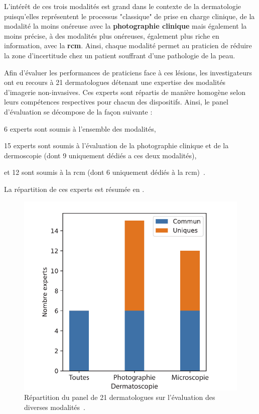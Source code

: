 L'intérêt de ces trois modalités est grand dans le contexte de la dermatologie puisqu'elles représentent le processus "classique" de prise en charge clinique, de la modalité la moins onéreuse avec la \textbf{photographie clinique} mais également la moins précise, à des modalités plus onéreuses, également plus riche en information, avec la \textbf{\gls{rcm}}. Ainsi, chaque modalité permet au praticien de réduire la zone d'incertitude chez un patient souffrant d'une pathologie de la peau.

\addtocounter{footnote}{1}
\addtocounter{footnote}{1}
\addtocounter{footnote}{1}

Afin d'évaluer les performances de praticiens face à ces lésions, les investigateurs ont eu recours à 21 dermatologues détenant une expertise des modalités d'imagerie non-invasives. Ces experts sont répartis de manière homogène selon leurs compétences respectives pour chacun des dispositifs. Ainsi, le panel d'évaluation se décompose de la façon suivante : 
\begin{inlinerate}
    \item 6 experts sont soumis à l'ensemble des modalités,
    \item 15 experts sont soumis à l'évaluation de la photographie clinique et de la dermoscopie (dont 9 uniquement dédiés a ces deux modalités),
    \item et 12 sont soumis à la \gls{rcm} (dont 6 uniquement dédiés à la \gls{rcm})~\cite{Cinotti2018}.
\end{inlinerate}
La répartition de ces experts est résumée en .\par

\begin{figure}[H]
    \centering
    \includegraphics[width=0.6\linewidth]{contents/chapter_3_1/resources/experts_evaluation.pdf}
    \caption{Répartition du panel de 21 dermatologues sur l'évaluation des diverses modalités~\cite{Cinotti2018}.}
    \label{fig:experts_evaluation}
\end{figure}\par

